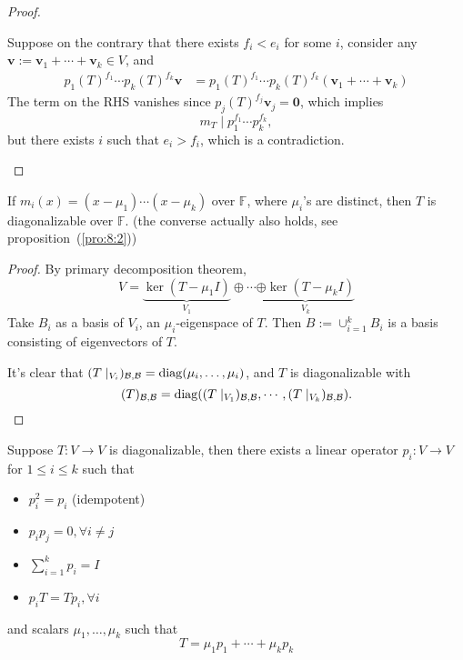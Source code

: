 \begin{proof}
\begin{enumerate}
Suppose on the contrary that there exists $f_i<e_i$ for some $i$, consider any $\bm v:=\bm v_1+\cdots+\bm v_k\in V$, and
\begin{align*}
p_1(T)^{f_1}\cdots p_k(T)^{f_k}\bm v
&=
p_1(T)^{f_1}\cdots p_k(T)^{f_k}(\bm v_1+\cdots+\bm v_k)
\end{align*}
The term on the RHS vanishes since $p_j(T)^{f_j}\bm v_j=\bm0$, which implies
\[
m_T\mid p_1^{f_1}\cdots p_k^{f_k},
\]
but there exists $i$ such that $e_i>f_i$, which is a contradiction.
\end{enumerate}
\end{proof}


\begin{corollary}
If $m_i(x) = (x-\mu_1)\cdots(x-\mu_k)$ over $\mathbb{F}$, where $\mu_i$'s are distinct, then $T$ is diagonalizable over $\mathbb{F}$. (the converse actually also holds, see proposition~(\ref{pro:8:2}))
\end{corollary}
\begin{proof}
By primary decomposition theorem,
\[
V=\underbrace{\ker(T-\mu_1 I)}_{V_1}\oplus\cdots\underbrace{\oplus\ker(T-\mu_kI)}_{V_k}
\]
Take $B_i$ as a basis of $V_i$, an $\mu_i$-eigenspace of $T$.
Then $B:=\cup_{i=1}^kB_i$ is a basis consisting of eigenvectors of $T$.

It's clear that $(T\mid_{V_i})_{\mathcal{B},\mathcal{B}}=\operatorname{diag}(\mu_i,\dots,\mu_i)$, and $T$ is diagonalizable with 
\[
(T)_{\mathcal{B},\mathcal{B}}
=
\operatorname{diag}((T\mid_{V_1})_{\mathcal{B},\mathcal{B}},\cdots,(T\mid_{V_k})_{\mathcal{B},\mathcal{B}}).
\]
\end{proof}

\begin{corollary}\label{cor:9:2}
Suppose $T:V\to V$ is diagonalizable, then there exists a linear operator $p_i:V\to V$ for $1\le i\le k$ such that
\begin{itemize}
\item
$p_i^2=p_i$ (idempotent)
\item
$p_ip_j=0,\forall i\ne j$
\item
$\sum_{i=1}^kp_i=I$
\item
$p_iT=Tp_i,\forall i$
\end{itemize}
and scalars $\mu_1,\dots,\mu_k$ such that
\[
T=\mu_1p_1+\cdots+\mu_kp_k
\]
\end{corollary}


